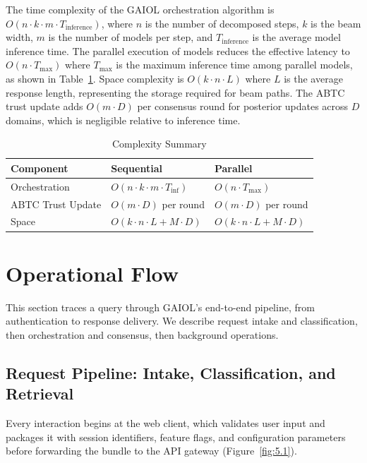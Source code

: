 \documentclass{iopjournal}
\begin{document}
The time complexity of the GAIOL orchestration algorithm is $O(n \cdot k \cdot m \cdot T_{\text{inference}})$, where $n$ is the number of decomposed steps, $k$ is the beam width, $m$ is the number of models per step, and $T_{\text{inference}}$ is the average model inference time. The parallel execution of models reduces the effective latency to $O(n \cdot T_{\max})$ where $T_{\max}$ is the maximum inference time among parallel models, as shown in Table~\ref{tab:complexity}. Space complexity is $O(k \cdot n \cdot L)$ where $L$ is the average response length, representing the storage required for beam paths. The ABTC trust update adds $O(m \cdot D)$ per consensus round for posterior updates across $D$ domains, which is negligible relative to inference time.
\begin{table}[H]
\centering
\caption{Complexity Summary}
\label{tab:complexity}
\begin{tabular}{lll}
\toprule
\textbf{Component} & \textbf{Sequential} & \textbf{Parallel} \\
\midrule
Orchestration & $O(n \cdot k \cdot m \cdot T_{\text{inf}})$ & $O(n \cdot T_{\max})$ \\

ABTC Trust Update 
& $O(m \cdot D)$ per round 
& $O(m \cdot D)$ per round \\

Space 
& $O(k \cdot n \cdot L + M \cdot D)$ 
& $O(k \cdot n \cdot L + M \cdot D)$ \\

\bottomrule
\end{tabular}
\end{table}

\section{Operational Flow}
\label{sec:flow}

This section traces a query through GAIOL's end-to-end pipeline, from authentication to response delivery. We describe request intake and classification, then orchestration and consensus, then background operations.

\subsection{Request Pipeline: Intake, Classification, and Retrieval}

Every interaction begins at the web client, which validates user input and packages it with session identifiers, feature flags, and configuration parameters before forwarding the bundle to the API gateway (Figure~\ref{fig:5.1}).
\end{document}
